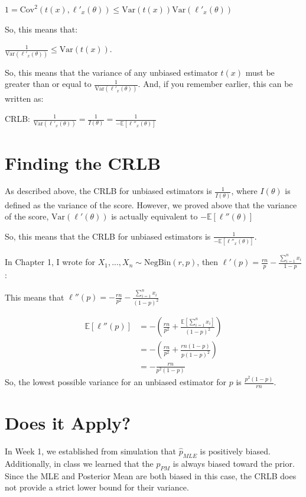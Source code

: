 \documentclass[
  letterpaper,
  DIV=11,
  numbers=noendperiod]{scrreprt}
\begin{document}
\(1 = \text{Cov}^2(t(x), \ell'_x(\theta)) \leq \text{Var}(t(x)) \text{Var}(\ell'_x(\theta))\)

So, this means that:

\(\frac{1}{\text{Var}(\ell'_x(\theta))} \leq \text{Var}(t(x))\).

So, this means that the variance of any unbiased estimator \(t(x)\) must
be greater than or equal to \(\frac{1}{\text{Var}(\ell'_x(\theta))}\).
And, if you remember earlier, this can be written as:

CRLB:
\(\frac{1}{\text{Var}(\ell'_x(\theta))} = \frac{1}{I(\theta)} = \frac{1}{-\mathbb{E}[\ell''_x(\theta)]}\)

\section{Finding the CRLB}\label{finding-the-crlb}

As described above, the CRLB for unbiased estimators is
\(\frac{1}{I(\theta)}\), where \(I(\theta)\) is defined as the variance
of the score. However, we proved above that the variance of the score,
\(\text{Var}(\ell'(\theta))\) is actually equivalent to
\(-\mathbb{E}[\ell''(\theta)]\)

So, this means that the CRLB for unbiased estimators is
\(\frac{1}{-\mathbb{E}[\ell''_x(\theta)]}\).

In Chapter 1, I wrote for \(X_1,...,X_n \sim \text{NegBin}(r, p)\), then
\(\ell'(p) = \frac{rn}{p} - \frac{\sum_{i=1}^n x_i}{1-p}\):

This means that
\(\ell''(p) = -\frac{rn}{p^2} - \frac{\sum_{i=1}^n x_i}{(1-p)^2}\)

\[
\begin{aligned}
\mathbb{E}\left[\ell''(p)\right] &= -\left(\frac{rn}{p^2} + \frac{\mathbb{E}[\sum_{i=1}^n x_i]}{(1-p)^2} \right) \\
&= -\left(\frac{rn}{p^2} + \frac{rn(1-p)}{p(1-p)^2} \right) \\
&= -\frac{rn}{p^2(1-p)}
\end{aligned}
\] So, the lowest possible variance for an unbiased estimator for \(p\)
is \(\frac{p^2(1-p)}{rn}\).

\section{Does it Apply?}\label{does-it-apply}

In Week 1, we established from simulation that \(\hat{p}_{MLE}\) is
positively biased. Additionally, in class we learned that the
\(\hat{p}_{PM}\) is always biased toward the prior. Since the MLE and
Posterior Mean are both biased in this case, the CRLB does not provide a
strict lower bound for their variance.
\end{document}
